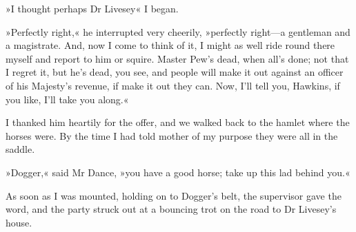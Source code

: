 »I thought perhaps Dr Livesey\longdash« I began.

»Perfectly right,« he interrupted very cheerily, »perfectly right—a gentleman and a magistrate. And, now I come to think of it, I might as well ride round there myself and report to him or squire. Master Pew's dead, when all's done; not that I regret it, but he's dead, you see, and people will make it out against an officer of his Majesty's revenue, if make it out they can. Now, I'll tell you, Hawkins, if you like, I'll take you along.«

I thanked him heartily for the offer, and we walked back to the hamlet where the horses were. By the time I had told mother of my purpose they were all in the saddle.

»Dogger,« said Mr Dance, »you have a good horse; take up this lad behind you.«

As soon as I was mounted, holding on to Dogger's belt, the supervisor gave the word, and the party struck out at a bouncing trot on the road to Dr Livesey's house.